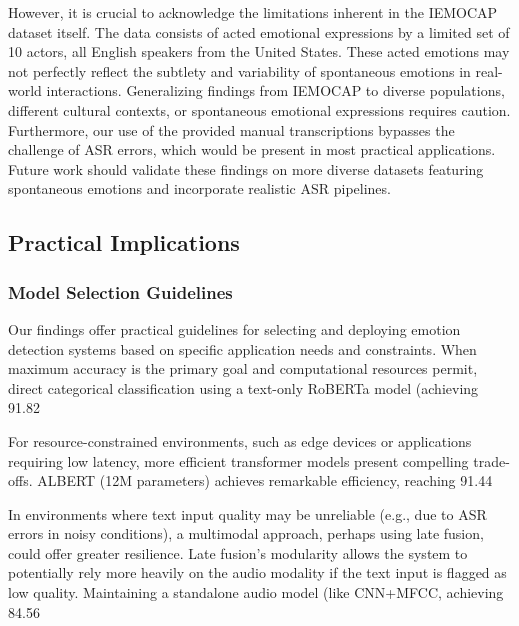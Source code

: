 \documentclass[12pt]{article}
\begin{document}
However, it is crucial to acknowledge the limitations inherent in the IEMOCAP dataset itself. The data consists of acted emotional expressions by a limited set of 10 actors, all English speakers from the United States. These acted emotions may not perfectly reflect the subtlety and variability of spontaneous emotions in real-world interactions. Generalizing findings from IEMOCAP to diverse populations, different cultural contexts, or spontaneous emotional expressions requires caution. Furthermore, our use of the provided manual transcriptions bypasses the challenge of ASR errors, which would be present in most practical applications. Future work should validate these findings on more diverse datasets featuring spontaneous emotions and incorporate realistic ASR pipelines.

\subsection{Practical Implications}
\subsubsection{Model Selection Guidelines}
Our findings offer practical guidelines for selecting and deploying emotion detection systems based on specific application needs and constraints. When maximum accuracy is the primary goal and computational resources permit, direct categorical classification using a text-only RoBERTa model (achieving 91.82%

For resource-constrained environments, such as edge devices or applications requiring low latency, more efficient transformer models present compelling trade-offs. ALBERT (12M parameters) achieves remarkable efficiency, reaching 91.44%

In environments where text input quality may be unreliable (e.g., due to ASR errors in noisy conditions), a multimodal approach, perhaps using late fusion, could offer greater resilience. Late fusion's modularity allows the system to potentially rely more heavily on the audio modality if the text input is flagged as low quality. Maintaining a standalone audio model (like CNN+MFCC, achieving 84.56%
\end{document}
